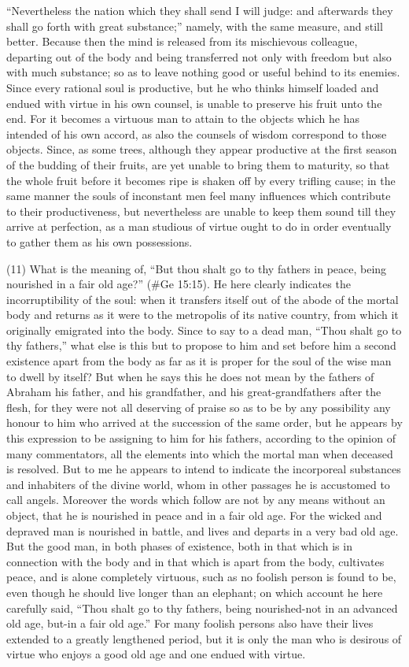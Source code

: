 ``Nevertheless the nation which they shall send I will judge: and afterwards they shall go forth with
great substance;'' namely, with the same measure, and still better. Because then the mind is
released from its mischievous colleague, departing out of the body and being transferred not only
with freedom but also with much substance; so as to leave nothing good or useful behind to its
enemies. Since every rational soul is productive, but he who thinks himself loaded and endued with
virtue in his own counsel, is unable to preserve his fruit unto the end. For it becomes a virtuous
man to attain to the objects which he has intended of his own accord, as also the counsels of
wisdom correspond to those objects. Since, as some trees, although they appear productive at the
first season of the budding of their fruits, are yet unable to bring them to maturity, so that the whole
fruit before it becomes ripe is shaken off by every trifling cause; in the same manner the souls of
inconstant men feel many influences which contribute to their productiveness, but nevertheless are
unable to keep them sound till they arrive at perfection, as a man studious of virtue ought to do in
order eventually to gather them as his own possessions.

(11) What is the meaning of, ``But thou shalt go to thy fathers in peace, being nourished in a fair old
age?'' (\#Ge 15:15). He here clearly indicates the incorruptibility of the soul: when it transfers
itself out of the abode of the mortal body and returns as it were to the metropolis of its native
country, from which it originally emigrated into the body. Since to say to a dead man, ``Thou shalt go
to thy fathers,'' what else is this but to propose to him and set before him a second existence apart
from the body as far as it is proper for the soul of the wise man to dwell by itself? But when he says
this he does not mean by the fathers of Abraham his father, and his grandfather, and his
great-grandfathers after the flesh, for they were not all deserving of praise so as to be by any
possibility any honour to him who arrived at the succession of the same order, but he appears by
this expression to be assigning to him for his fathers, according to the opinion of many
commentators, all the elements into which the mortal man when deceased is resolved. But to me
he appears to intend to indicate the incorporeal substances and inhabiters of the divine world,
whom in other passages he is accustomed to call angels. Moreover the words which follow are not
by any means without an object, that he is nourished in peace and in a fair old age. For the wicked
and depraved man is nourished in battle, and lives and departs in a very bad old age. But the good
man, in both phases of existence, both in that which is in connection with the body and in that which
is apart from the body, cultivates peace, and is alone completely virtuous, such as no foolish
person is found to be, even though he should live longer than an elephant; on which account he
here carefully said, ``Thou shalt go to thy fathers, being nourished-not in an advanced old age,
but-in a fair old age.'' For many foolish persons also have their lives extended to a greatly
lengthened period, but it is only the man who is desirous of virtue who enjoys a good old age and
one endued with virtue.

